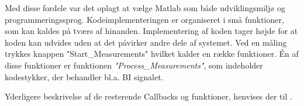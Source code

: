 Med disse fordele var det oplagt at vælge Matlab som både udviklingsmiljø og programmeringssprog.  
Kodeimplementeringen er organiseret i små funktioner, som kan kaldes på tværs af hinanden. Implementering af koden tager højde for at koden kan udvides uden at det påvirker andre dele af systemet. Ved en måling trykkes knappen "Start\_Measurements" hvilket kalder en række funktioner. Én af disse funktioner er funktionen \textit{"Process\_Measurements"}, som indeholder kodestykker, der behandler bl.a. BI signalet.

%





Yderligere beskrivelse af de resterende Callbacks og funktioner, henvises der til . 
